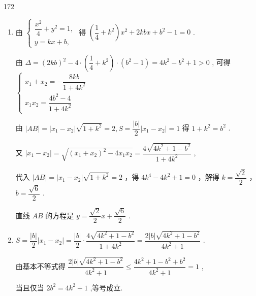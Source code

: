 \begin{enumerate}
\begin{enumerate}
\begin{jieda}
\begin{dingautolist}{172}
\begin{enumerate}[(1)]
                    \item 由 $\left\{  \begin{array}{l} \dfrac{{x}^{2}}{4} + {y}^{2} = 1, \\  y = {kx} + b, \end{array}\right.$ 得 $\left( {\dfrac{1}{4} + {k}^{2}}\right) {x}^{2} + {2kbx} + {b}^{2} - 1 = 0$ .

                    由 $\Delta  = {\left( 2kb\right) }^{2} - 4 \cdot  \left( {\dfrac{1}{4} + {k}^{2}}\right)  \cdot  \left( {{b}^{2} - 1}\right)  = 4{k}^{2} - {b}^{2} + 1 > 0$ , 可得 $\left\{\begin{array}{l} {x}_{1} + {x}_{2} =  - \dfrac{8kb}{1 + 4{k}^{2}} \\  {x}_{1}{x}_{2} = \dfrac{4{b}^{2} - 4}{1 + 4{k}^{2}} \end{array} \right.$

                    由 $\left| {AB}\right|  = \left| {{x}_{1} - {x}_{2}}\right| \sqrt{1 + {k}^{2}} = 2,S = \dfrac{\left| b\right| }{2}\left| {{x}_{1} - {x}_{2}}\right|  = 1$ 得 $1 + {k}^{2} = {b}^{2}$ .

                    又 $\left| {{x}_{1} - {x}_{2}}\right|  = \sqrt{{\left( {x}_{1} + {x}_{2}\right) }^{2} - 4{x}_{1}{x}_{2}} = \dfrac{4\sqrt{4{k}^{2} + 1 - {b}^{2}}}{1 + 4{k}^{2}}$ ,

                    代入 $\left| {AB}\right|  = \left| {{x}_{1} - {x}_{2}}\right| \sqrt{1 + {k}^{2}} = 2$ ，得 $4{k}^{4} - 4{k}^{2} + 1 = 0$ ，解得 $k = \dfrac{\sqrt{2}}{2}$ ， $b = \dfrac{\sqrt{6}}{2}$ .

                    直线 ${AB}$ 的方程是 $y = \dfrac{\sqrt{2}}{2}x + \dfrac{\sqrt{6}}{2}$ .

                    \item $S = \dfrac{\left| b\right| }{2}\left| {{x}_{1} - {x}_{2}}\right|  = \dfrac{\left| b\right| }{2} \cdot  \dfrac{4\sqrt{4{k}^{2} + 1 - {b}^{2}}}{1 + 4{k}^{2}} = \dfrac{2\left| b\right| \sqrt{4{k}^{2} + 1 - {b}^{2}}}{4{k}^{2} + 1}$ .

                    由基本不等式得 $\dfrac{2\left| b\right| \sqrt{4{k}^{2} + 1 - {b}^{2}}}{4{k}^{2} + 1} \leq  \dfrac{4{k}^{2} + 1 - {b}^{2} + {b}^{2}}{4{k}^{2} + 1} = 1$ ,

                    当且仅当 $2{b}^{2} = 4{k}^{2} + 1$ ,等号成立.


\end{enumerate}
\end{dingautolist}
\end{jieda}
\end{enumerate}
\end{enumerate}

